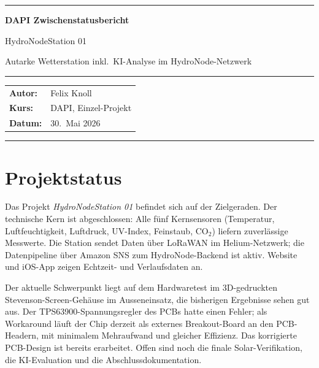 \documentclass[11pt,a4paper]{scrartcl}
\begin{document}
\begin{titlepage}
  \centering
  \vspace*{3cm}

  {\color{accent}\rule{\linewidth}{2pt}}
  \vspace{0.8cm}

  {\LARGE\bfseries\color{accent} DAPI Zwischenstatusbericht\par}
  \vspace{0.4cm}
  {\large HydroNodeStation 01\par}
  {\normalsize Autarke Wetterstation inkl.\ KI-Analyse im HydroNode-Netzwerk\par}

  \vspace{0.8cm}
  {\color{accent}\rule{\linewidth}{1pt}}
  \vspace{2cm}

  \begin{tabular}{ll}
    \textbf{Autor:}       & Felix Knoll \\[4pt]
    \textbf{Kurs:}        & DAPI, Einzel-Projekt \\[4pt]
    \textbf{Datum:}       & 30.\ Mai 2026 \\
  \end{tabular}

  \vfill
  {\color{accent}\rule{\linewidth}{2pt}}
\end{titlepage}

\section{Projektstatus}

Das Projekt \textit{HydroNodeStation 01} befindet sich auf der Zielgeraden.
Der technische Kern ist abgeschlossen: Alle fünf Kernsensoren (Temperatur,
Luftfeuchtigkeit, Luftdruck, UV-Index, Feinstaub, CO${}_2$) liefern zuverlässige
Messwerte.
Die Station sendet Daten über LoRaWAN im Helium-Netzwerk; die Datenpipeline über
Amazon SNS zum HydroNode-Backend ist aktiv.
Website und iOS-App zeigen Echtzeit- und Verlaufsdaten an.

Der aktuelle Schwerpunkt liegt auf dem Hardwaretest im 3D-gedruckten
Stevenson-Screen-Gehäuse im Ausseneinsatz, die bisherigen Ergebnisse sehen gut aus.
Der TPS63900-Spannungsregler des PCBs hatte einen Fehler; als Workaround läuft
der Chip derzeit als externes Breakout-Board an den PCB-Headern, mit minimalem
Mehraufwand und gleicher Effizienz.
Das korrigierte PCB-Design ist bereits erarbeitet.
Offen sind noch die finale Solar-Verifikation, die KI-Evaluation und die
Abschlussdokumentation.
\end{document}
